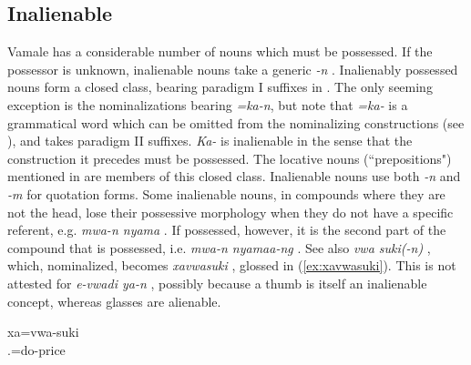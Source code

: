 \subsection{Inalienable}
\label{ssec:InalPoss}

Vamale has a considerable number of nouns which must be possessed. If the possessor is unknown, inalienable nouns take a generic \textit{-n} .  
Inalienably possessed nouns form a closed class, bearing paradigm I suffixes in . The only seeming exception is the nominalizations bearing \textit{=ka-n}, but note that \textit{=ka-} is a grammatical word which can be omitted from the nominalizing constructions (see ), and takes paradigm II suffixes. \textit{Ka-} is inalienable in the sense that the construction it precedes must be possessed. The locative nouns (``prepositions") mentioned in  are members of this closed class.
Inalienable nouns use both \textit{-n}  and \textit{-m}  for quotation forms.
Some inalienable nouns, in compounds where they are not the head, lose their possessive morphology when they do not have a specific referent, e.g. \textit{mwa-n nyama} . If possessed, however, it is the second part of the compound that is possessed, i.e. \textit{mwa-n nyamaa-ng} . See also \textit{vwa suki(-n)} , which, nominalized, becomes \textit{xavwasuki} , glossed in (\ref{ex:xavwasuki}). This is not attested for \textit{e-vwadi ya-n} , possibly because a thumb is itself an inalienable concept, whereas glasses are alienable.
	
	\ea \label{ex:xavwasuki}
	\gll xa=vwa-suki\\
	 .=do-price\\
	\glt {}
	\z 

